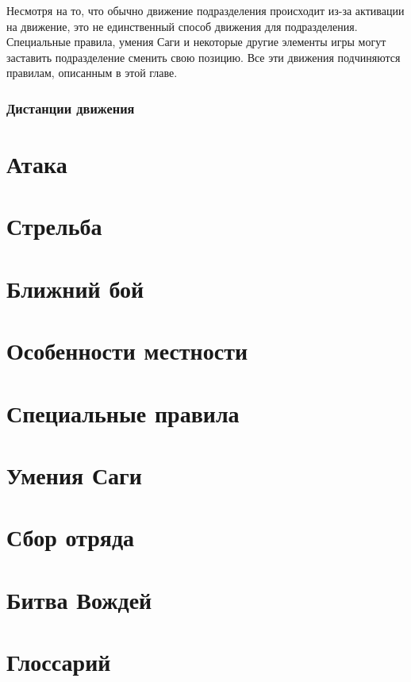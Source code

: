 \documentclass[a4paper,11pt,twoside]{article}
\begin{document}
Несмотря на то, что обычно движение подразделения происходит из-за активации на движение, это не единственный способ движения для подразделения. Специальные правила, умения Саги и некоторые другие элементы игры могут заставить подразделение сменить свою позицию. Все эти движения подчиняются правилам, описанным в этой главе.

\section*{Дистанции движения}


\part{Атака}
\part{Стрельба}
\part{Ближний бой}
\part{Особенности местности}
\part{Специальные правила}
\part{Умения Саги}
\part{Сбор отряда}
\part{Битва Вождей}
\part{Глоссарий}
\end{document}
